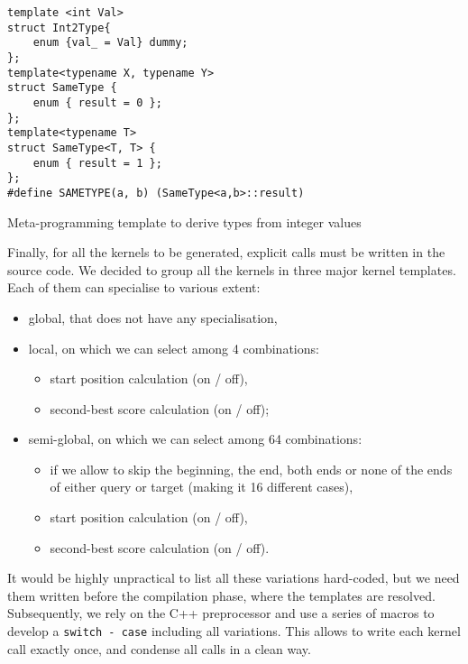 \begin{listing}[h!]
	\begin{verbatim}
template <int Val>
struct Int2Type{
	enum {val_ = Val} dummy;
};
template<typename X, typename Y>
struct SameType {
	enum { result = 0 };
};
template<typename T>
struct SameType<T, T> {
	enum { result = 1 };
};
#define SAMETYPE(a, b) (SameType<a,b>::result)
	\end{verbatim}

	
	\caption{Meta-programming template to derive types from integer values}
	\label{lst:tmp}
\end{listing}
	
Finally, for all the kernels to be generated, explicit calls must be written in the source code. We decided to group all the kernels in three major kernel templates. Each of them can specialise to various extent:

\begin{itemize}
	\item global, that does not have any specialisation,
	\item local, on which we can select among 4 combinations:
	\begin{itemize}
		\item start position calculation (on / off),
		\item second-best score calculation (on / off);
	\end{itemize}
	\item semi-global, on which we can select among 64 combinations:
	\begin{itemize}
		\item if we allow to skip the beginning, the end, both ends or none of the ends of either query or target (making it 16 different cases),
		\item start position calculation (on / off),
		\item second-best score calculation (on / off).
	\end{itemize}
\end{itemize}

It would be highly unpractical to list all these variations hard-coded, but we need them written before the compilation phase, where the templates are resolved. Subsequently, we rely on the C++ preprocessor and use a series of macros to develop a \verb|switch - case| including all variations. This allows to write each kernel call exactly once, and condense all calls in a clean way.


